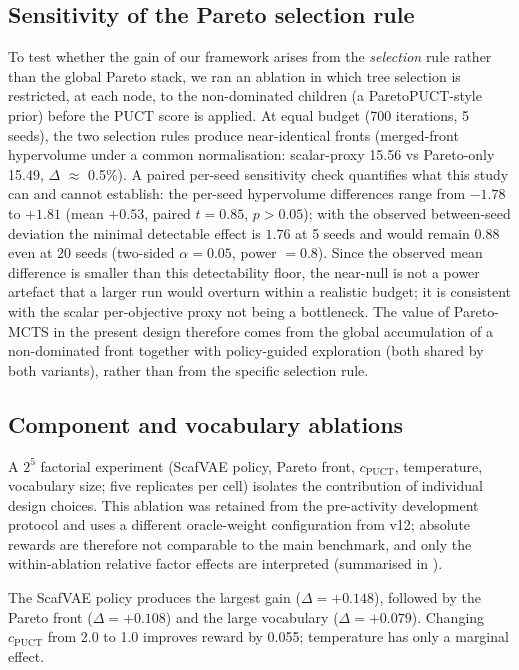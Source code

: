 \documentclass[10pt,a4paper]{article}
\begin{document}
\subsection{Sensitivity of the Pareto selection rule}
\label{sec:selection_ablation}

To test whether the gain of our framework arises from the \emph{selection} rule rather than the global Pareto stack, we ran an ablation in which tree selection is restricted, at each node, to the non-dominated children (a ParetoPUCT-style prior) before the PUCT score is applied. At equal budget (\num{700} iterations, \num{5} seeds), the two selection rules produce near-identical fronts (merged-front hypervolume under a common normalisation: scalar-proxy \num{15.56} vs Pareto-only \num{15.49}, $\Delta$ $\approx$ \num{0.5}\%). A paired per-seed sensitivity check quantifies what this study can and cannot establish: the per-seed hypervolume differences range from $\num{-1.78}$ to $+\num{1.81}$ (mean $+\num{0.53}$, paired $t=\num{0.85}$, $p>\num{0.05}$); with the observed between-seed deviation the minimal detectable effect is $\num{1.76}$ at \num{5} seeds and would remain $\num{0.88}$ even at \num{20} seeds (two-sided $\alpha=\num{0.05}$, power $=\num{0.8}$). Since the observed mean difference is smaller than this detectability floor, the near-null is not a power artefact that a larger run would overturn within a realistic budget; it is consistent with the scalar per-objective proxy not being a bottleneck. The value of Pareto-MCTS in the present design therefore comes from the global accumulation of a non-dominated front together with policy-guided exploration (both shared by both variants), rather than from the specific selection rule.

\subsection{Component and vocabulary ablations}
\label{sec:ablation}

A $2^{5}$ factorial experiment (ScafVAE policy, Pareto front, $c_{\text{PUCT}}$, temperature, vocabulary size; five replicates per cell) isolates the contribution of individual design choices. This ablation was retained from the pre-activity development protocol and uses a different oracle-weight configuration from v12; absolute rewards are therefore not comparable to the main benchmark, and only the within-ablation relative factor effects are interpreted (summarised in ).

The ScafVAE policy produces the largest gain ($\Delta = +\num{0.148}$), followed by the Pareto front ($\Delta = +\num{0.108}$) and the large vocabulary ($\Delta = +\num{0.079}$). Changing $c_{\text{PUCT}}$ from \num{2.0} to \num{1.0} improves reward by \num{0.055}; temperature has only a marginal effect.
\end{document}
